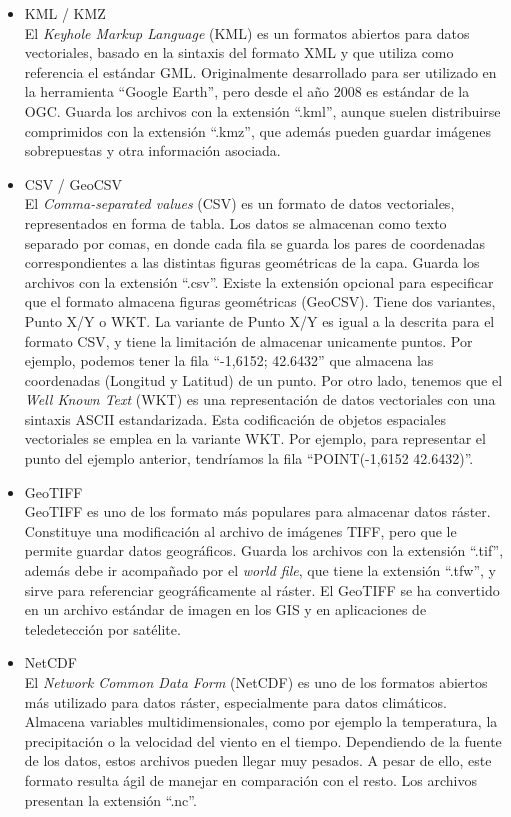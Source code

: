 \begin{itemize}
\item KML / KMZ \\
El \textit{Keyhole Markup Language} (KML) es un formatos abiertos para datos vectoriales, basado en la sintaxis del formato XML y que utiliza como referencia el estándar GML.
Originalmente desarrollado para ser utilizado en la herramienta “Google Earth”, pero desde el año 2008 es estándar de la OGC.
Guarda los archivos con la extensión “.kml”, aunque suelen distribuirse comprimidos con la extensión “.kmz”, que además pueden guardar imágenes sobrepuestas y otra información asociada.

\item CSV / GeoCSV \\
El \textit{Comma-separated values} (CSV) es un formato de datos vectoriales, representados en forma de tabla.
Los datos se almacenan como texto separado por comas, en donde cada fila se guarda los pares de coordenadas correspondientes a las distintas figuras geométricas de la capa.
Guarda los archivos con la extensión “.csv”. 
Existe la extensión opcional para especificar que el formato almacena figuras geométricas (GeoCSV).
Tiene dos variantes, Punto X/Y o WKT. La variante de Punto X/Y es igual a la descrita para el formato CSV, y tiene la limitación de almacenar unicamente puntos. 
Por ejemplo, podemos tener la fila “-1,6152; 42.6432” que almacena las coordenadas (Longitud y Latitud) de un punto.
Por otro lado, tenemos que el \textit{Well Known Text} (WKT) es una representación de datos vectoriales con una sintaxis ASCII estandarizada. 
Esta codificación de objetos espaciales vectoriales se emplea en la variante WKT. 
Por ejemplo, para representar el punto del ejemplo anterior, tendríamos la fila “POINT(-1,6152 42.6432)”.

\item GeoTIFF \\
GeoTIFF es uno de los formato más populares para almacenar datos ráster.
Constituye una modificación al archivo de imágenes TIFF, pero que le permite guardar datos geográficos.
Guarda los archivos con la extensión “.tif”, además debe ir acompañado por el \textit{world file}, que tiene la extensión “.tfw”, y sirve para referenciar geográficamente al ráster.
El GeoTIFF se ha convertido en un archivo estándar de imagen en los GIS y en aplicaciones de teledetección por satélite. 
 
\item NetCDF \\
El \textit{Network Common Data Form} (NetCDF) es uno de los formatos abiertos más utilizado para datos ráster, especialmente para datos climáticos.
Almacena variables multidimensionales, como por ejemplo  la temperatura, la precipitación o la velocidad del viento en el tiempo. 
Dependiendo de la fuente de los datos, estos archivos pueden llegar muy pesados. A pesar de ello, este formato resulta ágil de manejar en comparación con el resto.
Los archivos presentan la extensión “.nc”.
\end{itemize}

